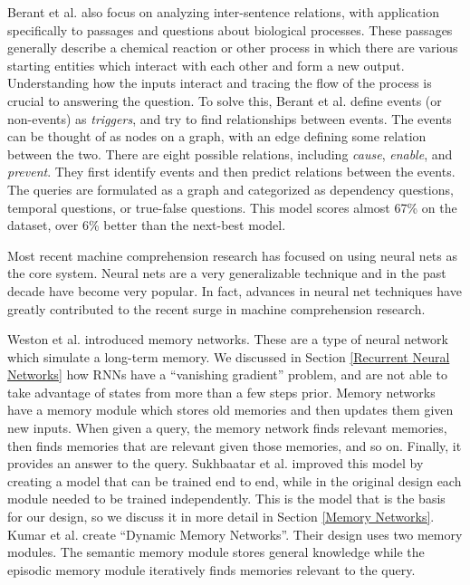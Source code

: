 \documentclass[pageno]{final_paper}
\begin{document}
Berant et al. \cite{Berant2014} also focus on analyzing inter-sentence
relations, with application specifically to passages and questions about
biological processes. These passages generally describe a chemical reaction or
other process in which there are various starting entities which interact with
each other and form a new output. Understanding how the inputs interact and
tracing the flow of the process is crucial to answering the question. To solve
this, Berant et al. define events (or non-events) as \textit{triggers}, and try
to find relationships between events. The events can be thought of as nodes on a
graph, with an edge defining some relation between the two. There are eight
possible relations, including \textit{cause}, \textit{enable}, and
\textit{prevent}. They first identify events and then predict relations between
the events. The queries are formulated as a graph and categorized as dependency
questions, temporal questions, or true-false questions. This model scores almost
67\% on the dataset, over 6\% better than the next-best model.

Most recent machine comprehension research has focused on using neural nets as
the core system. Neural nets are a very generalizable technique and in the past
decade have become very popular. In fact, advances in neural net techniques have
greatly contributed to the recent surge in machine comprehension research.

Weston et al. \cite{Weston2015a} introduced memory networks. These are a type of
neural network which simulate a long-term memory. We discussed in Section
\ref{Recurrent Neural Networks} how RNNs have a ``vanishing gradient'' problem,
and are not able to take advantage of states from more than a few steps prior.
Memory networks have a memory module which stores old memories and then updates
them given new inputs. When given a query, the memory network finds relevant
memories, then finds memories that are relevant given those memories, and so on.
Finally, it provides an answer to the query. Sukhbaatar et al.
\cite{Sukhbaatar2015} improved this model by creating a model that can be
trained end to end, while in the original design each module needed to be
trained independently. This is the model that is the basis for our design, so we
discuss it in more detail in Section \ref{Memory Networks}. Kumar et al.
\cite{Kumar2015} create ``Dynamic Memory Networks''. Their design uses two
memory modules. The semantic memory module stores general knowledge while the
episodic memory module iteratively finds memories relevant to the query.
\end{document}
